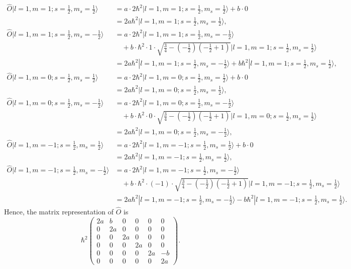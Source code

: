 \documentclass{article}
\begin{document}
\begin{align*}
\hat{O} |l = 1, m = 1; s = \frac{1}{2}, m_s = \frac{1}{2}\rangle &= a \cdot 2\hbar^2 |l = 1, m = 1; s = \frac{1}{2}, m_s = \frac{1}{2}\rangle + b \cdot 0 \\
&= 2a\hbar^2 |l = 1, m = 1; s = \frac{1}{2}, m_s = \frac{1}{2}\rangle, \\
\hat{O} |l = 1, m = 1; s = \frac{1}{2}, m_s = -\frac{1}{2}\rangle &= a \cdot 2\hbar^2 |l = 1, m = 1; s = \frac{1}{2}, m_s = -\frac{1}{2}\rangle \\
&\quad + b \cdot \hbar^2 \cdot 1 \cdot \sqrt{\frac{3}{4} - \left(-\frac{1}{2}\right)\left(-\frac{1}{2} + 1\right)} |l = 1, m = 1; s = \frac{1}{2}, m_s = \frac{1}{2}\rangle \\
&= 2a\hbar^2 |l = 1, m = 1; s = \frac{1}{2}, m_s = -\frac{1}{2}\rangle + b\hbar^2 |l = 1, m = 1; s = \frac{1}{2}, m_s = \frac{1}{2}\rangle, \\
\hat{O} |l = 1, m = 0; s = \frac{1}{2}, m_s = \frac{1}{2}\rangle &= a \cdot 2\hbar^2 |l = 1, m = 0; s = \frac{1}{2}, m_s = \frac{1}{2}\rangle + b \cdot 0 \\
&= 2a\hbar^2 |l = 1, m = 0; s = \frac{1}{2}, m_s = \frac{1}{2}\rangle, \\
\hat{O} |l = 1, m = 0; s = \frac{1}{2}, m_s = -\frac{1}{2}\rangle &= a \cdot 2\hbar^2 |l = 1, m = 0; s = \frac{1}{2}, m_s = -\frac{1}{2}\rangle \\
&\quad + b \cdot \hbar^2 \cdot 0 \cdot \sqrt{\frac{3}{4} - \left(-\frac{1}{2}\right)\left(-\frac{1}{2} + 1\right)} |l = 1, m = 0; s = \frac{1}{2}, m_s = \frac{1}{2}\rangle \\
&= 2a\hbar^2 |l = 1, m = 0; s = \frac{1}{2}, m_s = -\frac{1}{2}\rangle, \\
\hat{O} |l = 1, m = -1; s = \frac{1}{2}, m_s = \frac{1}{2}\rangle &= a \cdot 2\hbar^2 |l = 1, m = -1; s = \frac{1}{2}, m_s = \frac{1}{2}\rangle + b \cdot 0 \\
&= 2a\hbar^2 |l = 1, m = -1; s = \frac{1}{2}, m_s = \frac{1}{2}\rangle, \\
\hat{O} |l = 1, m = -1; s = \frac{1}{2}, m_s = -\frac{1}{2}\rangle &= a \cdot 2\hbar^2 |l = 1, m = -1; s = \frac{1}{2}, m_s = -\frac{1}{2}\rangle \\
&\quad + b \cdot \hbar^2 \cdot (-1) \cdot \sqrt{\frac{3}{4} - \left(-\frac{1}{2}\right)\left(-\frac{1}{2} + 1\right)} |l = 1, m = -1; s = \frac{1}{2}, m_s = \frac{1}{2}\rangle \\
&= 2a\hbar^2 |l = 1, m = -1; s = \frac{1}{2}, m_s = -\frac{1}{2}\rangle - b\hbar^2 |l = 1, m = -1; s = \frac{1}{2}, m_s = \frac{1}{2}\rangle.
\end{align*}
Hence, the matrix representation of $\hat{O}$ is
\[\hbar^2 \begin{pmatrix} 2a & b & 0 & 0 & 0 & 0 \\ 0 & 2a & 0 & 0 & 0 & 0 \\ 0 & 0 & 2a & 0 & 0 & 0 \\ 0 & 0 & 0 & 2a & 0 & 0 \\ 0 & 0 & 0 & 0 & 2a & -b \\ 0 & 0 & 0 & 0 & 0 & 2a \end{pmatrix}.\]
\end{document}
